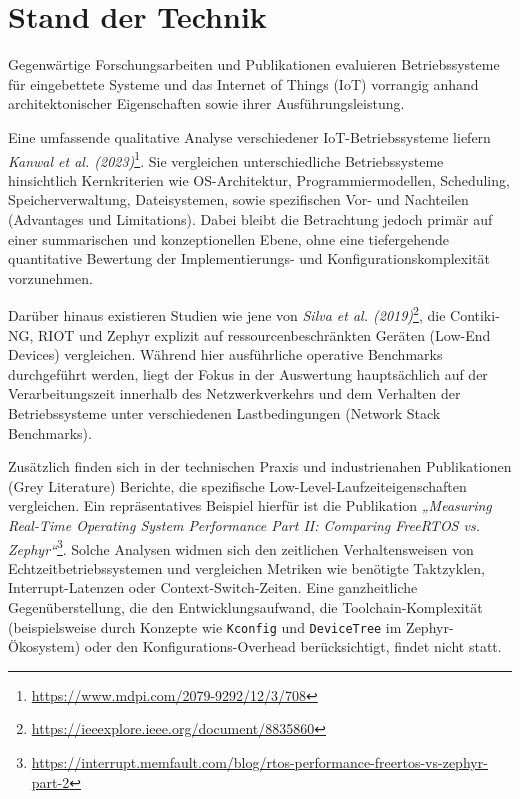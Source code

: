 \section{Stand der Technik}
\label{sec:StandDerTechnik}

Gegenwärtige Forschungsarbeiten und Publikationen evaluieren Betriebssysteme für eingebettete Systeme und das Internet of Things (IoT) vorrangig anhand architektonischer Eigenschaften sowie ihrer Ausführungsleistung. 

Eine umfassende qualitative Analyse verschiedener IoT-Betriebssysteme liefern \textit{Kanwal et al. (2023)}\footnote{\url{https://www.mdpi.com/2079-9292/12/3/708}}. Sie vergleichen unterschiedliche Betriebssysteme hinsichtlich Kernkriterien wie OS-Architektur, Programmiermodellen, Scheduling, Speicherverwaltung, Dateisystemen, sowie spezifischen Vor- und Nachteilen (Advantages und Limitations). Dabei bleibt die Betrachtung jedoch primär auf einer summarischen und konzeptionellen Ebene, ohne eine tiefergehende quantitative Bewertung der Implementierungs- und Konfigurationskomplexität vorzunehmen.

Darüber hinaus existieren Studien wie jene von \textit{Silva et al. (2019)}\footnote{\url{https://ieeexplore.ieee.org/document/8835860}}, die Contiki-NG, RIOT und Zephyr explizit auf ressourcenbeschränkten Geräten (Low-End Devices) vergleichen. Während hier ausführliche operative Benchmarks durchgeführt werden, liegt der Fokus in der Auswertung hauptsächlich auf der Verarbeitungszeit innerhalb des Netzwerkverkehrs und dem Verhalten der Betriebssysteme unter verschiedenen Lastbedingungen (Network Stack Benchmarks).

Zusätzlich finden sich in der technischen Praxis und industrienahen Publikationen (Grey Literature) Berichte, die spezifische Low-Level-Laufzeiteigenschaften vergleichen. Ein repräsentatives Beispiel hierfür ist die Publikation \textit{„Measuring Real-Time Operating System Performance Part II: Comparing FreeRTOS vs. Zephyr“}\footnote{\url{https://interrupt.memfault.com/blog/rtos-performance-freertos-vs-zephyr-part-2}}. Solche Analysen widmen sich den zeitlichen Verhaltensweisen von Echtzeitbetriebssystemen und vergleichen Metriken wie benötigte Taktzyklen, Interrupt-Latenzen oder Context-Switch-Zeiten. Eine ganzheitliche Gegenüberstellung, die den Entwicklungsaufwand, die Toolchain-Komplexität (beispielsweise durch Konzepte wie \texttt{Kconfig} und \texttt{DeviceTree} im Zephyr-Ökosystem) oder den Konfigurations-Overhead berücksichtigt, findet nicht statt.

